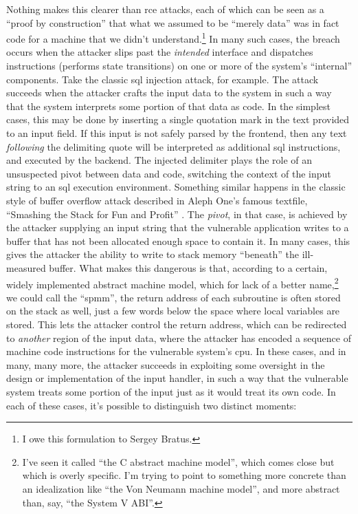 \documentclass[12pt,glossary]{dalthesis}
\begin{document}
Nothing makes this clearer than \gls{rce} attacks, each of
which can be seen as a ``proof by construction'' that what we assumed to be
``merely data'' was in fact code for a machine that we didn't understand.\footnote{I
owe this formulation to Sergey Bratus.} In many such cases, the breach occurs
when the attacker slips past the \emph{intended} interface and dispatches
instructions (performs state transitions) on one or more of the system's
``internal'' components. Take the classic \gls{sql} injection attack, for example. The
attack succeeds when the attacker crafts the input data to the system in such a
way that the system interprets some portion of that data as code. In the simplest
cases, this may be done by inserting a single quotation mark in the text
provided to an input field. If this input is not safely parsed by the frontend,
then any text \emph{following} the delimiting quote will be interpreted as additional
\gls{sql} instructions, and executed by the backend. The injected delimiter plays the
role of an unsuspected pivot between data and code, switching the context of the
input string to an \gls{sql} execution environment.
Something similar happens in the classic style of buffer overflow attack
described in Aleph One's famous textfile, ``Smashing the Stack for Fun and
Profit'' \cite{aleph96}. The \emph{pivot}, in that case, is achieved by the attacker supplying an
input string that the vulnerable application writes to a buffer that has not
been allocated enough space to contain it. In many cases, this gives the
attacker the ability to write to stack memory ``beneath'' the ill-measured buffer.
What makes this dangerous is that, according to a certain, widely implemented
abstract machine model, which for lack of a better name,\footnote{I've seen it called ``the C abstract machine model'', which comes close but which
  is overly specific. I'm trying to point to something more concrete than an
  idealization like ``the Von Neumann machine model'', and more abstract than, say,
  ``the System V ABI''.} we could call the ``\gls{spmm}'', the return address of each subroutine is often stored on
the stack as well, just a few words below the space where local variables are
stored. This lets the attacker control the return address, which can be
redirected to \emph{another} region of the input data, where the attacker has encoded
a sequence of machine code instructions for the vulnerable system's \gls{cpu}.
In these cases, and in many, many more, the attacker succeeds in exploiting some
oversight in the design or implementation of the input handler, in such a way
that the vulnerable system treats some portion of the input just as it would
treat its own code. In each of these cases, it's possible to distinguish two
distinct moments:
\end{document}
